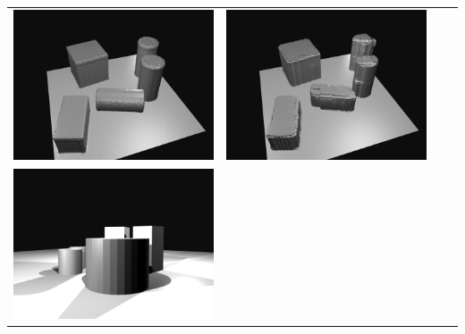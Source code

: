 \begin{tabular}{cccc}
\includegraphics[height=\turnheight]{xf2hcoes8lp9fb1t_SEQ_gt.png} &
\includegraphics[height=\turnheight]{xf2hcoes8lp9fb1t_SEQ_pred_voxlets.png} \\
\includegraphics[height=\turnheight]{kmrkmma8u2456lgk_SEQ_input.png} &

\end{tabular}
